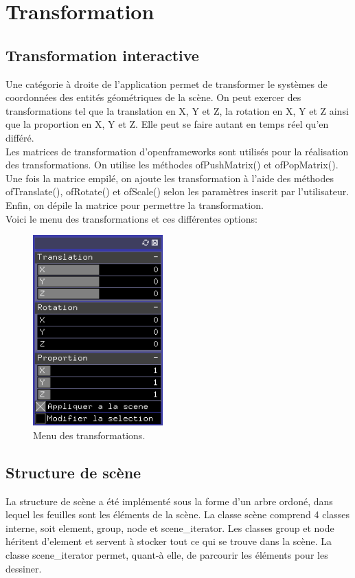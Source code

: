 \section{Transformation}
\subsection{Transformation interactive}
Une catégorie à droite de l’application permet de transformer le systèmes de coordonnées des entités géométriques de la scène. On peut exercer des transformations tel que la translation en X, Y et Z, la rotation en X, Y et Z ainsi que la proportion en X, Y et Z. Elle peut se faire autant en temps réel qu’en différé. \\

Les matrices de transformation d’openframeworks sont utilisés pour la réalisation des transformations. On utilise les méthodes ofPushMatrix() et ofPopMatrix(). Une fois la matrice empilé, on ajoute les transformation à l’aide des méthodes ofTranslate(), ofRotate() et ofScale() selon les paramètres inscrit par l’utilisateur. Enfin, on dépile la matrice pour permettre la transformation.\\

Voici le menu des transformations et ces différentes options:\\
\begin{figure}[h]
	\centering
	\includegraphics[width=5cm]{fig/transformations.png}
	\caption{Menu des transformations.}
	\label{fig:transformations}
\end{figure}

\subsection{Structure de scène}
La structure de scène a été implémenté sous la forme d'un arbre ordoné, dans lequel les feuilles sont les éléments de la scène. La classe scène comprend 4 classes interne, soit element, group, node et scene\_iterator. Les classes group et node héritent d'element et  servent à stocker tout ce qui se trouve dans la scène. La classe scene\_iterator permet, quant-à elle, de parcourir les éléments pour les dessiner. \\

